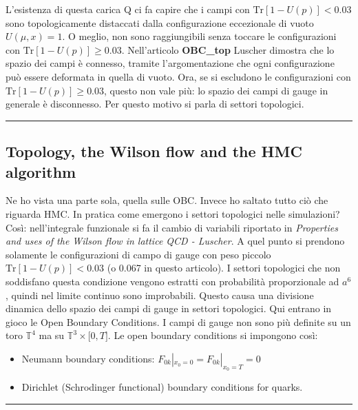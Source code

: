 \documentclass[12pt,a4paper,openright]{article}
\begin{document}
L'esistenza di questa carica Q ci fa capire che i campi con $\text{Tr}[1-U(p)]<0.03$ sono topologicamente distaccati dalla configurazione eccezionale di vuoto $U(\mu, x) = 1$. O meglio, non sono raggiungibili senza toccare le configurazioni con $\text{Tr}[1-U(p)]\ge 0.03$.
\newline
Nell'articolo {\bf OBC\_top} Luscher dimostra che lo spazio dei campi è connesso, tramite l'argomentazione che ogni configurazione può essere deformata in quella di vuoto. Ora, se si escludono le configurazioni con $\text{Tr}[1-U(p)]\ge 0.03$, questo non vale più: lo spazio dei campi di gauge in generale è disconnesso. Per questo motivo si parla di settori topologici.
\newline
\hrule

\subsection{Topology, the Wilson flow and the HMC algorithm}
Ne ho vista una parte sola, quella sulle OBC. Invece ho saltato tutto ciò che riguarda HMC.
\newline
In pratica come emergono i settori topologici nelle simulazioni? Così: nell'integrale funzionale si fa il cambio di variabili riportato in \textit{Properties and uses of the Wilson flow in lattice QCD - Luscher}. A quel punto si prendono solamente le configurazioni di campo di gauge con peso piccolo $\text{Tr}[1-U(p)]<0.03$ (o 0.067 in questo articolo).
I settori topologici che non soddisfano questa condizione vengono estratti con probabilità proporzionale ad $a^6$, quindi nel limite continuo sono improbabili. Questo causa una divisione dinamica dello spazio dei campi di gauge in settori topologici.
\newline
Qui entrano in gioco le Open Boundary Conditions. I campi di gauge non sono più definite su un toro $\mathbb T^4$ ma su $\mathbb T^3 \times \mathbb [0,T]$.
Le open boundary conditions si impongono così:
\begin{itemize}
  \item Neumann boundary conditions: $F_{0k}|_{x_0=0} = F_{0k}|_{x_0=T} = 0$
  \item Dirichlet (Schrodinger functional) boundary conditions for quarks.
\end{itemize}
\hrule
\end{document}
